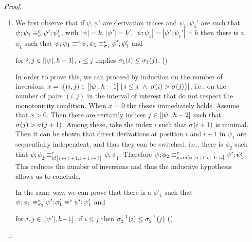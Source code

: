 \begin{proof}
\begin{enumerate}
\item 
  We first observe that if $\psi, \psi'$ are derivation traces and
  $\psi_1, \psi_1'$ are such that
  $\psi;\psi_1 \equiv^c_{\perm} \psi';\psi_1'$, with $|\psi| = k$, $|\psi'|=k'$, $|\psi;\psi_1| = |\psi';\psi_1'|=h$ then there is
  a $\phi_1$ such that
  $\psi;\psi_1 \equiv^c \psi;\phi_1 \equiv^c_{\perm_1} \psi';\psi_1'$
  and
  \begin{center}
    for $i, j \in \interval[|\psi|]{h-1}$, $i \leq j$ implies
     $\perm_1(i) \leq \perm_1(j)$. \hfill{(\dag)}
  \end{center}
  
  In order to prove this, we can proceed by induction on the number of
  inversions
  $x = |\{ (i, j) \in \interval[|\psi|]{h - 1} \mid i \leq
  j\ \land\ \perm(i) > \perm(j) \}|$, i.e., on the number of pairs
  $(i,j)$ in the interval of interest that do not respect the
  monotonicity condition. When $x=0$ the thesis immediately
  holds. Assume that $x > 0$. Then there are certainly indices
  $j \in \interval[|\psi|]{h-2}$ such that
  $\perm(j) > \perm(j+1)$. Among these, take the index $i$ such that
  $\perm(i+1)$ is minimal. Then it can be shown that direct derivations at 
  position $i$ and
  $i+1$ in $\psi_1$ are sequentially independent,  and thus they can be switched, i.e., there
  is $\phi_2$ such that
  $\psi; \phi_2 \equiv^c_{id[i \mapsto i+1, i+1 \mapsto i]} \psi;
  \psi_1$. Therefore
  $\psi; \phi_2 \equiv^c_{\perm \circ id[i \mapsto i+1, i+1 \mapsto
    i]} \psi'; \psi_1'$. This reduces the number of inversions and thus
  the inductive hypothesis allows us to conclude.
    
  In the same way, we can prove that there is
  a $\phi'_1$ such that
  $\psi;\phi_1 \equiv_{\perm_2}^c \psi';\phi'_1 \equiv^c \psi';\psi_1'$
  and
  \begin{center}
    for $i, j \in \interval[|\psi'|]{h\!-\!1}$, if $i \leq j$ then
     $\perm^{-1}_2(i) \leq \perm^{-1}_2(j)$ {(\ddag)}
  \end{center}
  

\end{enumerate}
\end{proof}
